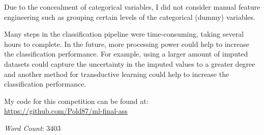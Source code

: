 \documentclass[a4paper,11pt]{article}
\begin{document}
Due to the concealment of categorical variables, I did not consider
manual feature engineering such as grouping certain levels of the
categorical (dummy) variables.

Many steps in the classification pipeline were time-consuming, taking
several hours to complete. In the future, more processing power could
help to increase the classification performance. For example, using a
larger amount of imputed datasets could capture the uncertainty in the
imputed values to a greater degree and another method for
transductive learning could help to increase the classification performance.

My code for this competition can be found at:\\
\url{https://github.com/Pold87/ml-final-ass}

\emph{Word Count}: 3403
\printbibliography
\end{document}
